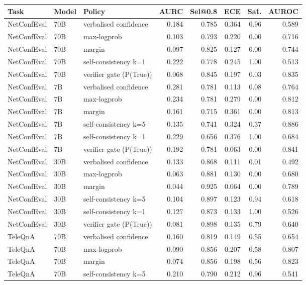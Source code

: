 \begin{tabular}{lllrrrrr}
\toprule
Task & Model & Policy & AURC & Sel@0.8 & ECE & Sat. & AUROC \\
\midrule
NetConfEval & 70B & verbalised confidence & 0.184 & 0.785 & 0.364 & 0.96 & 0.589 \\
NetConfEval & 70B & max-logprob & 0.103 & 0.793 & 0.220 & 0.00 & 0.716 \\
NetConfEval & 70B & margin & 0.097 & 0.825 & 0.127 & 0.00 & 0.744 \\
NetConfEval & 70B & self-consistency k=1 & 0.222 & 0.778 & 0.245 & 1.00 & 0.513 \\
NetConfEval & 70B & verifier gate (P(True)) & 0.068 & 0.845 & 0.197 & 0.03 & 0.835 \\
NetConfEval & 7B & verbalised confidence & 0.281 & 0.781 & 0.113 & 0.08 & 0.764 \\
NetConfEval & 7B & max-logprob & 0.234 & 0.781 & 0.279 & 0.00 & 0.812 \\
NetConfEval & 7B & margin & 0.161 & 0.715 & 0.361 & 0.00 & 0.813 \\
NetConfEval & 7B & self-consistency k=5 & 0.135 & 0.741 & 0.324 & 0.37 & 0.886 \\
NetConfEval & 7B & self-consistency k=1 & 0.229 & 0.656 & 0.376 & 1.00 & 0.684 \\
NetConfEval & 7B & verifier gate (P(True)) & 0.192 & 0.781 & 0.063 & 0.00 & 0.841 \\
NetConfEval & 30B & verbalised confidence & 0.133 & 0.868 & 0.111 & 0.01 & 0.492 \\
NetConfEval & 30B & max-logprob & 0.063 & 0.881 & 0.130 & 0.00 & 0.680 \\
NetConfEval & 30B & margin & 0.044 & 0.925 & 0.064 & 0.00 & 0.789 \\
NetConfEval & 30B & self-consistency k=5 & 0.104 & 0.897 & 0.123 & 0.94 & 0.618 \\
NetConfEval & 30B & self-consistency k=1 & 0.127 & 0.873 & 0.133 & 1.00 & 0.526 \\
NetConfEval & 30B & verifier gate (P(True)) & 0.081 & 0.898 & 0.135 & 0.79 & 0.640 \\
TeleQnA & 70B & verbalised confidence & 0.160 & 0.819 & 0.149 & 0.55 & 0.654 \\
TeleQnA & 70B & max-logprob & 0.090 & 0.856 & 0.207 & 0.58 & 0.807 \\
TeleQnA & 70B & margin & 0.074 & 0.856 & 0.198 & 0.56 & 0.823 \\
TeleQnA & 70B & self-consistency k=5 & 0.210 & 0.790 & 0.212 & 0.96 & 0.541 \\

\end{tabular}
